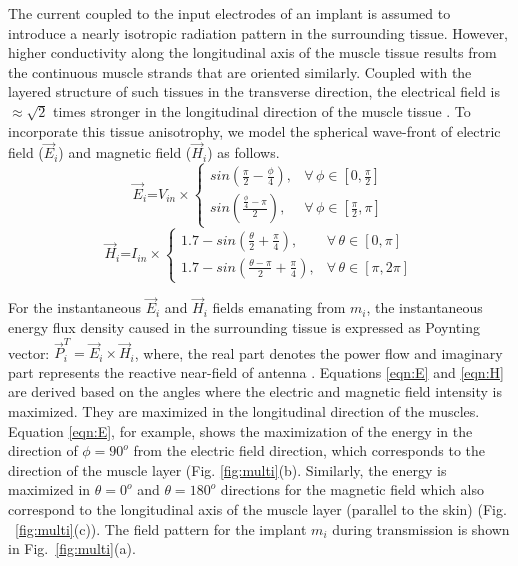 The current coupled to the input electrodes of an implant is assumed to introduce a nearly isotropic radiation pattern in the surrounding tissue. However, higher conductivity along the longitudinal axis of the muscle tissue results from the continuous muscle strands that are oriented similarly. Coupled with the layered structure of such tissues in the transverse direction, the electrical field is $\approx \sqrt{2} $ times stronger in the longitudinal direction of the muscle tissue \cite{aniso}. To incorporate this tissue anisotrophy, we model the spherical wave-front of electric field ($\overrightarrow{E}_i$) and magnetic field ($\overrightarrow{H}_i$) as follows.
\begin{equation} \label{eqn:E}
\overrightarrow{E}_i \text{=}V_{in}\times\begin{cases}  
sin\left(\frac{\pi}{2} - \frac{\phi}{4} \right),  & \forall\,\phi \in [0,\frac{\pi}{2}]\\
sin\left(\frac{\frac{\phi}{4} - \pi}{2} \right),  & \forall\,\phi \in [\frac{\pi}{2},{\pi}]
\end{cases}
\end{equation}
\begin{equation} \label{eqn:H}
\overrightarrow{H}_i \text{=}I_{in}\times\begin{cases}  
1.7-sin\left(\frac{\theta}{2} + \frac{\pi}{4} \right),  & \forall\,\theta \in [0,\pi]\\
1.7-sin\left(\frac{\theta-\pi}{2} + \frac{\pi}{4} \right),  & \forall\,\theta \in [\pi,2\pi]
\end{cases}
\end{equation}

For the instantaneous $\overrightarrow{E}_i$ and $\overrightarrow{H}_i$ fields emanating from $m_i$,  the instantaneous energy flux density caused in the surrounding tissue is expressed as Poynting vector: $\overrightarrow{P}_i^T = \overrightarrow{E}_i \times \overrightarrow{H}_i$, where, the real part denotes the power flow and imaginary part represents the reactive near-field of antenna \cite{mikki}. Equations \ref{eqn:E} and \ref{eqn:H} are derived based on the angles where the electric and magnetic field intensity is maximized. They are maximized in the longitudinal direction of the muscles. Equation \ref{eqn:E}, for example, shows the maximization of the energy in the direction of $\phi=90^o$ from the electric field direction, which corresponds to the direction of the muscle layer (Fig. \ref{fig:multi}(b). Similarly, the energy is maximized in $\theta=0^o$ and
$\theta=180^o$ directions for the magnetic field which also correspond to the longitudinal axis of the muscle layer (parallel to the skin) (Fig. ~\ref{fig:multi}(c)).
The field pattern for the implant $m_i$ during transmission is shown in Fig.~\ref{fig:multi}(a).  

